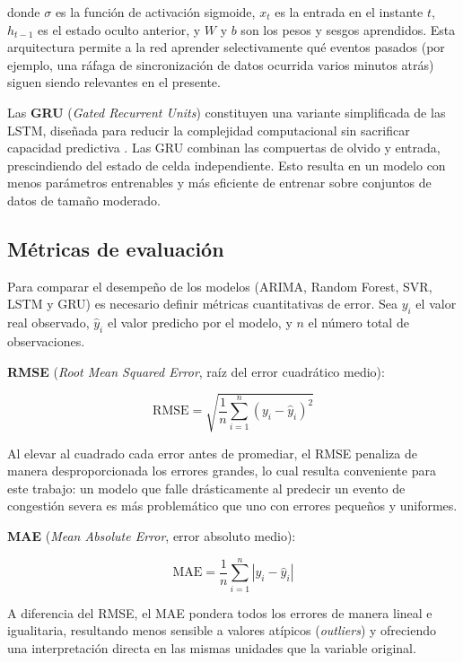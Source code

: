 \documentclass[12pt]{report}
\begin{document}
donde $\sigma$ es la función de activación sigmoide, $x_t$ es la entrada en el instante $t$, $h_{t-1}$ es el estado oculto anterior, y $W$ y $b$ son los pesos y sesgos aprendidos. Esta arquitectura permite a la red aprender selectivamente qué eventos pasados (por ejemplo, una ráfaga de sincronización de datos ocurrida varios minutos atrás) siguen siendo relevantes en el presente.

Las \textbf{GRU} (\textit{Gated Recurrent Units}) constituyen una variante simplificada de las LSTM, diseñada para reducir la complejidad computacional sin sacrificar capacidad predictiva \cite{cho2014}. Las GRU combinan las compuertas de olvido y entrada, prescindiendo del estado de celda independiente. Esto resulta en un modelo con menos parámetros entrenables y más eficiente de entrenar sobre conjuntos de datos de tamaño moderado.

\subsection{Métricas de evaluación}
\label{subsec:metricas_evaluacion}

Para comparar el desempeño de los modelos (ARIMA, Random Forest, SVR, LSTM y GRU) es necesario definir métricas cuantitativas de error. Sea $y_i$ el valor real observado, $\hat{y}_i$ el valor predicho por el modelo, y $n$ el número total de observaciones.

\textbf{RMSE} (\textit{Root Mean Squared Error}, raíz del error cuadrático medio):

\begin{equation}
    \mbox{RMSE} = \sqrt{\frac{1}{n}\sum_{i=1}^{n}(y_i - \hat{y}_i)^2}
    \label{eq:rmse}
\end{equation}

Al elevar al cuadrado cada error antes de promediar, el RMSE penaliza de manera desproporcionada los errores grandes, lo cual resulta conveniente para este trabajo: un modelo que falle drásticamente al predecir un evento de congestión severa es más problemático que uno con errores pequeños y uniformes.

\textbf{MAE} (\textit{Mean Absolute Error}, error absoluto medio):

\begin{equation}
    \mbox{MAE} = \frac{1}{n}\sum_{i=1}^{n}\left|y_i - \hat{y}_i\right|
    \label{eq:mae}
\end{equation}

A diferencia del RMSE, el MAE pondera todos los errores de manera lineal e igualitaria, resultando menos sensible a valores atípicos (\textit{outliers}) y ofreciendo una interpretación directa en las mismas unidades que la variable original.
\end{document}
